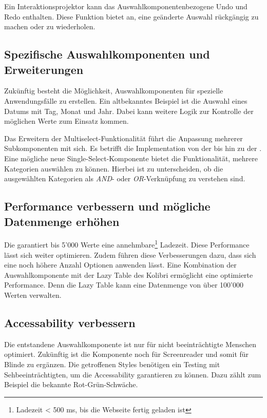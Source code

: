 Ein Interaktionsprojektor kann das Auswahlkomponentenbezogene Undo und Redo enthalten. 
Diese Funktion bietet an, eine geänderte Auswahl rückgängig zu machen oder zu wiederholen. 


\subsection{Spezifische Auswahlkomponenten und Erweiterungen}
\label{sec:specificComponents}

Zukünftig besteht die Möglichkeit, Auswahlkomponenten für spezielle Anwendungsfälle zu erstellen. 
Ein altbekanntes Beispiel ist die Auswahl eines Datums mit Tag, Monat und Jahr. 
Dabei kann weitere Logik zur Kontrolle der möglichen Werte zum Einsatz kommen. 

Das Erweitern der Multiselect-Funktionalität führt die Anpassung mehrerer Subkomponenten mit sich. 
Es betrifft die Implementation von der  bis hin zu der . 
Eine mögliche neue Single-Select-Komponente bietet die Funktionalität, mehrere Kategorien auswählen zu können. 
Hierbei ist zu unterscheiden, ob die ausgewählten Kategorien als \emph{AND}- oder \emph{OR}-Verknüpfung zu verstehen sind. 


\subsection{Performance verbessern und mögliche Datenmenge erhöhen}
\label{sec:betterPerformance}

Die  garantiert bis 5'000 Werte eine annehmbare\footnote{
    Ladezeit < 500 ms, bis die Webseite fertig geladen ist
} Ladezeit. 
Diese Performance lässt sich weiter optimieren. 
Zudem führen diese Verbesserungen dazu, dass sich eine noch höhere Anzahl Optionen anwenden lässt. 
Eine Kombination der Auswahlkomponente mit der Lazy Table des Kolibri ermöglicht eine optimierte Performance. 
Denn die Lazy Table kann eine Datenmenge von über 100'000 Werten verwalten. 


\subsection{Accessability verbessern}
\label{sec:betterAccessability}

Die entstandene Auswahlkomponente ist nur für nicht beeinträchtigte Menschen optimiert. 
Zukünftig ist die Komponente noch für Screenreader und somit für Blinde zu ergänzen. 
Die getroffenen Styles benötigen ein Testing mit Sehbeeinträchtigten, um die Accessability garantieren zu können. 
Dazu zählt zum Beispiel die bekannte Rot-Grün-Schwäche. 


